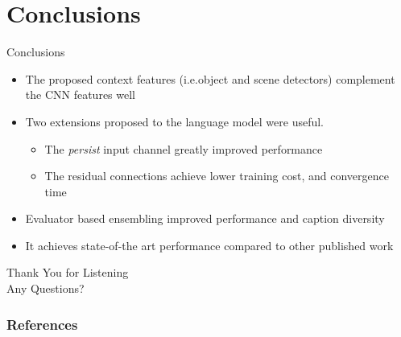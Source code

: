 \documentclass{beamer}
\begin{document}
\section{Conclusions}
\begin{frame}{Conclusions}
\begin{itemize}
        \item The proposed context features (i.e.\@ object and scene detectors) complement the CNN features well 
    \item Two extensions proposed to the language model were useful. 
       \begin{itemize}
           \item The \emph{persist} input channel greatly improved performance
           \item The residual connections achieve lower training cost, and convergence time
       \end{itemize}
    \item Evaluator based ensembling improved performance and caption diversity
    \item It achieves state-of-the art performance compared to other published work
\end{itemize}
\end{frame}
\begin{frame}{}
\begin{center}
    \Large Thank You for Listening\\[6mm]
    \Large Any Questions? 
\end{center}
\end{frame}
\begin{frame}[allowframebreaks]
        \frametitle{References}
        
\end{frame}
\end{document}
